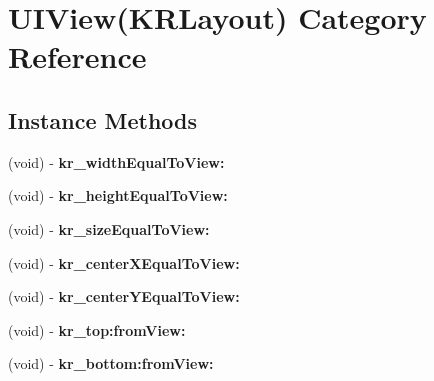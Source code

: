 \hypertarget{category_u_i_view_07_k_r_layout_08}{}\section{U\+I\+View(K\+R\+Layout) Category Reference}
\label{category_u_i_view_07_k_r_layout_08}
\subsection*{Instance Methods}
\begin{DoxyCompactItemize}
\item 
\mbox{\label{category_u_i_view_07_k_r_layout_08_a7c773575222204c05cbf70783c6f07d8}} 
(void) -\/ {\bfseries kr\+\_\+width\+Equal\+To\+View\+:}
\item 
\mbox{\label{category_u_i_view_07_k_r_layout_08_a0cfb1fc58d5c10b23f94369daac65bd9}} 
(void) -\/ {\bfseries kr\+\_\+height\+Equal\+To\+View\+:}
\item 
\mbox{\label{category_u_i_view_07_k_r_layout_08_a2ec5d0d76f679e41221776baa8924ecf}} 
(void) -\/ {\bfseries kr\+\_\+size\+Equal\+To\+View\+:}
\item 
\mbox{\label{category_u_i_view_07_k_r_layout_08_a56708a1439163f02c6c181ecaaa4691e}} 
(void) -\/ {\bfseries kr\+\_\+center\+X\+Equal\+To\+View\+:}
\item 
\mbox{\label{category_u_i_view_07_k_r_layout_08_ae4d4103fb037b6e6bf19d46a6d3da2a7}} 
(void) -\/ {\bfseries kr\+\_\+center\+Y\+Equal\+To\+View\+:}
\item 
\mbox{\label{category_u_i_view_07_k_r_layout_08_af2c40b73ceaba4028a4f253a0b67aaeb}} 
(void) -\/ {\bfseries kr\+\_\+top\+:from\+View\+:}
\item 
\mbox{\label{category_u_i_view_07_k_r_layout_08_a2add85fe01f5be4cd67624b0739685c9}} 
(void) -\/ {\bfseries kr\+\_\+bottom\+:from\+View\+:}
\item 
\mbox{\label{category_u_i_view_07_k_r_layout_08_a9366049e938cab48c4992a22d4098530}} 

\end{DoxyCompactItemize}
